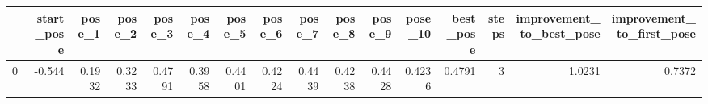 \begin{tabular}{lrrrrrrrrrrrrrrr}
\toprule
{} &  start\_pose &  pose\_1 &  pose\_2 &  pose\_3 &  pose\_4 &  pose\_5 &  pose\_6 &  pose\_7 &  pose\_8 &  pose\_9 &  pose\_10 &  best\_pose &  steps &  improvement\_to\_best\_pose &  improvement\_to\_first\_pose \\
\midrule
0 &      -0.544 &  0.1932 &  0.3233 &  0.4791 &  0.3958 &  0.4401 &  0.4224 &  0.4439 &  0.4238 &  0.4428 &   0.4236 &     0.4791 &      3 &                    1.0231 &                     0.7372 \\
\bottomrule
\end{tabular}
